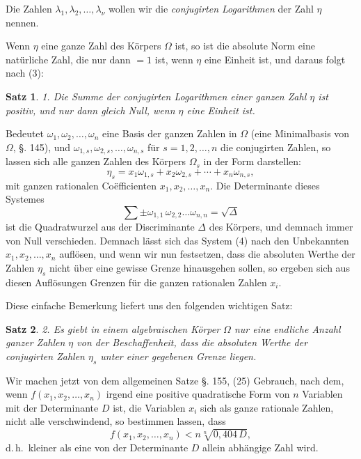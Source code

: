 \documentclass[12pt,a4paper]{article}
\newtheorem*{satz}{Satz}
\begin{document}
Die Zahlen $\lambda_1, \lambda_2, \ldots, \lambda_\nu$ wollen wir die \emph{conjugirten Logarithmen} der Zahl $\eta$ nennen.

Wenn $\eta$ eine ganze Zahl des Körpers $\Omega$ ist, so ist die absolute Norm eine natürliche Zahl, die nur dann $= 1$ ist, wenn $\eta$ eine Einheit ist, und daraus folgt nach (3):

\begin{satz}
1. Die Summe der conjugirten Logarithmen einer ganzen Zahl $\eta$ ist positiv, und nur dann gleich Null, wenn $\eta$ eine Einheit ist.
\end{satz}

Bedeutet $\omega_1, \omega_2, \ldots, \omega_n$ eine Basis der ganzen Zahlen in $\Omega$ (eine Minimalbasis von $\Omega$, \S. 145), und $\omega_{1,s}, \omega_{2,s}, \ldots, \omega_{n,s}$ für $s = 1, 2, \ldots, n$ die conjugirten Zahlen, so lassen sich alle ganzen Zahlen des Körpers $\Omega_s$ in der Form darstellen:
\begin{equation}\label{eq:185-4}
\eta_s = x_1\omega_{1,s} + x_2\omega_{2,s} + \cdots + x_n\omega_{n,s},
\end{equation}
mit ganzen rationalen Coëfficienten $x_1, x_2, \ldots, x_n$. Die Determinante dieses Systemes
\[
\sum \pm \omega_{1,1}\,\omega_{2,2} \ldots \omega_{n,n} = \sqrt{\Delta}
\]
ist die Quadratwurzel aus der Discriminante $\Delta$ des Körpers, und demnach immer von Null verschieden. Demnach lässt sich das System (4) nach den Unbekannten $x_1, x_2, \ldots, x_n$ auflösen, und wenn wir nun festsetzen, dass die absoluten Werthe der Zahlen $\eta_s$ nicht über eine gewisse Grenze hinausgehen sollen, so ergeben sich aus diesen Auflösungen Grenzen für die ganzen rationalen Zahlen $x_i$.

Diese einfache Bemerkung liefert uns den folgenden wichtigen Satz:

\begin{satz}
2. Es giebt in einem algebraischen Körper $\Omega$ nur eine endliche Anzahl ganzer Zahlen $\eta$ von der Beschaffenheit, dass die absoluten Werthe der conjugirten Zahlen $\eta_s$ unter einer gegebenen Grenze liegen.
\end{satz}

Wir machen jetzt von dem allgemeinen Satze \S. 155, (25) Gebrauch, nach dem, wenn $f(x_1, x_2, \ldots, x_n)$ irgend eine positive quadratische Form von $n$ Variablen mit der Determinante $D$ ist, die Variablen $x_i$ sich als ganze rationale Zahlen, nicht alle verschwindend, so bestimmen lassen, dass
\[
f(x_1, x_2, \ldots, x_n) < n\sqrt[n]{0{,}404\,D},
\]
d.\,h.\ kleiner als eine von der Determinante $D$ allein abhängige Zahl wird.
\end{document}

